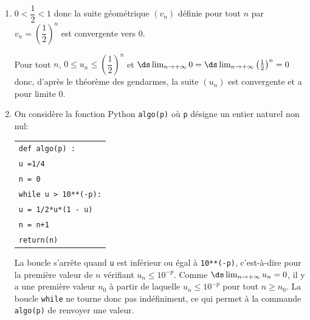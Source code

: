 \begin{enumerate}
\item 
$0<\dfrac{1}{2}<1$ donc la suite géométrique $(v_n)$ définie pour tout $n$ par $v_n=\left (\dfrac{1}{2} \right )^n$ est convergente vers 0.

Pour tout $n$, $ 0 \leqslant u_n \leqslant \left(\dfrac12\right)^n$ et $\ds\lim_{n\to +\infty} 0 = \ds\lim_{n\to +\infty} \left (\frac{1}{2}\right )^n=0$ donc, d'après le théorème des gendarmes, la suite $(u_n)$ est convergente et a pour limite 0.

\item On considère la fonction Python \texttt{algo(p)} où \texttt{p} désigne un entier naturel non nul:

\begin{center}
\begin{tabular}{|l|}\hline
\texttt{def algo(p) :}\\
\quad  \texttt{u =1/4}\\
\quad \texttt{n = 0}\\
\quad \texttt{while u > 10**(-p):}\\
\quad \qquad \texttt{u = 1/2*u*(1 - u)}\\
\quad \qquad \texttt{n = n+1}\\
\quad \texttt{return(n)}\\ \hline
\end{tabular}
\end{center}

La boucle s'arrête quand \texttt{u} est inférieur ou égal à \texttt{10**(-p)}, c'est-à-dire pour la première valeur de $n$ vérifiant $u_n \leqslant 10^{-p}$.
Comme $\ds\lim_{n\to +\infty} u_n=0$, il y a une première valeur $n_0$ à partir de laquelle $u_n \leqslant 10^{-p}$ pour tout $n\geqslant n_0$.
La boucle \texttt{while} ne tourne donc pas indéfiniment, ce qui permet à la commande \texttt{algo(p)} de renvoyer une valeur.
\end{enumerate}

\bigskip
